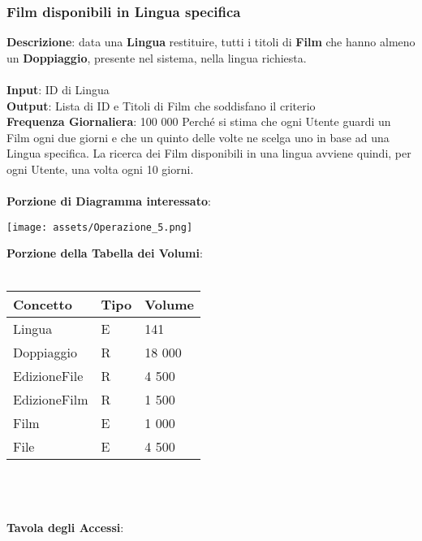 \documentclass{article}
\begin{document}
\subsubsection{Film disponibili in Lingua specifica}
\textbf{Descrizione}: data una \textbf{Lingua} restituire, tutti i titoli di \textbf{Film} che hanno almeno un \textbf{Doppiaggio}, presente nel sistema, nella lingua richiesta. \\ \\
\textbf{Input}: ID di Lingua \\
\textbf{Output}: Lista di ID e Titoli di Film che soddisfano il criterio \\
\textbf{Frequenza Giornaliera}: 100 000 Perché si stima che ogni Utente guardi un Film ogni due giorni e che un quinto delle volte ne scelga uno in base ad una Lingua specifica. La ricerca dei Film disponibili in una lingua avviene quindi, per ogni Utente, una volta ogni 10 giorni. \\ \\
\textbf{Porzione di Diagramma interessato}: \\ 
\begin{center}
    \centering
    \texttt{[image: assets/Operazione\_5.png]}
\end{center}
\textbf{Porzione della Tabella dei Volumi}: \\ \\ 
\begin{tabular}{|C{2.6cm}|C{2.6cm}|C{2.6cm}|}
\hline
    \textbf{Concetto} & \textbf{Tipo} & \textbf{Volume} \\
\hline
 Lingua & E & 141 \\
\hline
 Doppiaggio & R & 18 000 \\
\hline
 EdizioneFile & R & 4 500 \\
\hline
 EdizioneFilm & R & 1 500 \\
\hline
 Film & E & 1 000 \\
\hline
 File & E & 4 500 \\
\hline 
\end{tabular} \\ \\ \\
\textbf{Tavola degli Accessi}: \\ \\ 
\end{document}
